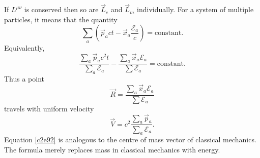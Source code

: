 \begin{enumerate}
If $L^{\mu\nu}$ is conserved then so are $\vec{L}_e$ and $\vec{L}_m$ 
individually.  For a system of multiple particles, it means that the quantity
\begin{equation}\label{c2e90}
\sum_a \left(\vec{p}_act - \vec{x}_a\frac{\mathcal{E}_a}{c}\right) = 
\text{constant.}
\end{equation}
Equivalently,
\begin{equation}\label{c2e91}
\frac{\sum_a\vec{p}_ac^2t}{\sum_a \mathcal{E}_a} - \frac{\sum_a\vec{x}_a 
\mathcal{E}_a}{\sum \mathcal{E}_a} = \text{constant.}
\end{equation}
Thus a point
\begin{equation}\label{c2e92}
\vec{R} = \frac{\sum_a\vec{x}_a \mathcal{E}_a}{\sum \mathcal{E}_a}
\end{equation}
travels with uniform velocity
\begin{equation}\label{c2e93}
\vec{V} = c^2\frac{\sum_a\vec{p}_a}{\sum_a \mathcal{E}_a}.
\end{equation}
Equation \eqref{c2e92} is analogous to the centre of mass vector of classical 
mechanics. The formula merely replaces mass in classical mechanics with energy.
\end{enumerate}
